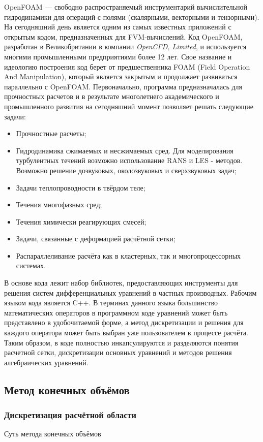 		\hspace{2em}OpenFOAM — свободно распространяемый инструментарий вычислительной гидродинамики для операций с полями (скалярными, векторными и тензорными). На сегодняшний день является одним из самых известных приложений с открытым кодом, предназначенных для FVM-вычислений.\cite{openfoam}
		Код OpenFOAM, разработан в Великобритании в компании \textit{OpenCFD, Limited}, и используется многими промышленными предприятиями более 12 лет. Свое название и идеологию построения код берет от предшественника FOAM (Field Operation And Manipulation), который является закрытым и продолжает развиваться параллельно с OpenFOAM. Первоначально, программа предназначалась для прочностных расчетов и в результате многолетнего академического и промышленного развития на сегодняшний момент позволяет решать следующие задачи:
	\begin{itemize}
		\item Прочностные расчеты;
		\item Гидродинамика сжимаемых и несжимаемых сред. Для моделирования турбулентных течений возможно использование RANS и LES - методов. Возможно решение дозвуковых, околозвуковых и сверхзвуковых задач;
		\item Задачи теплопроводности в твёрдом теле;
		\item Течения многофазных сред;
		\item Течения химически реагирующих смесей;
		\item Задачи, связанные с деформацией расчётной сетки;
		\item Распараллеливание расчёта как в кластерных, так и многопроцессорных системах.
	\end{itemize}

	В основе кода лежит набор библиотек, предоставляющих инструменты для решения систем дифференциальных уравнений в частных производных. Рабочим языком кода является C++. В терминах данного языка большинство математических операторов в программном коде уравнений может быть представлено в удобочитаемой форме, а метод дискретизации и решения для каждого оператора может быть выбран уже пользователем в процессе расчёта. Таким образом, в коде полностью инкапсулируются и разделяются понятия расчетной сетки, дискретизации основных уравнений и методов решения алгебраических уравнений.
	\newpage
	\subsection{Метод конечных объёмов}
		\subsubsection{Дискретизация расчётной области}
			Суть метода конечных объёмов 
